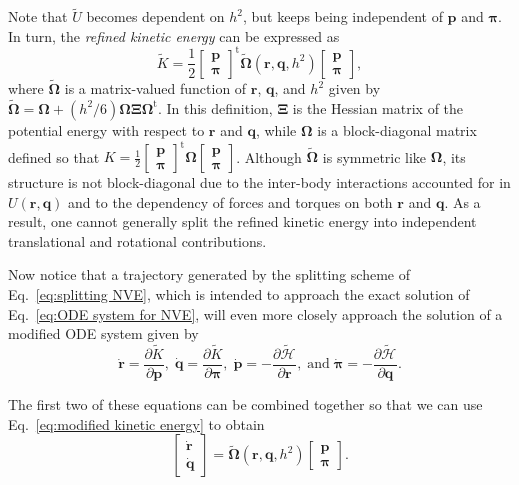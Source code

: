 \documentclass[
journal=jctcce,
layout=twocolumn
]{achemso}
\newcommand{\mt}[1]{\boldsymbol{\mathbf{#1}}}   %
\newcommand{\vt}[1]{\boldsymbol{\mathbf{#1}}}   %
\newcommand{\tr}[1]{#1^\text{t}}                %
\newcommand{\diff}[2]{\frac{\partial #1}{\partial #2}} %
\newcommand{\Ham}[1]{{\mathcal H}_\text{#1}}    %
\newcommand{\timestep}{h}
\newcommand{\refined}[1]{\widetilde{#1}}
\begin{document}
Note that $\refined U$ becomes dependent on $\timestep^2$, but keeps being independent of $\vt p$ and $\vt \pi$.
In turn, the \textit{refined kinetic energy} can be expressed as
\begin{equation}
\label{eq:modified kinetic energy}
\refined K = \frac{1}{2} \tr{\left[\begin{array}{c} \vt p \\ \vt \pi \end{array}\right]} \refined{\mathbf \Omega}(\vt r, \vt q, \timestep^2) \left[\begin{array}{c} \vt p \\ \vt \pi \end{array}\right],
\end{equation}
where $\refined{\mathbf \Omega}$ is a matrix-valued function of $\vt r$, $\vt q$, and $\timestep^2$ given by $\tilde{\mt \Omega} = {\mt \Omega} + ({\timestep^2}/{6}) {\mt \Omega} {\mt \Xi} \tr{\mt \Omega}$.
In this definition, $\mt \Xi$ is the Hessian matrix of the potential energy with respect to $\vt r$ and $\vt q$, while ${\mt \Omega}$ is a block-diagonal matrix defined so that $K = \frac{1}{2} \tr{[\substack{\vt p \\ \vt \pi}]} {\mt \Omega} [\substack{\vt p \\ \vt \pi}]$.
Although $\refined{\mathbf \Omega}$ is symmetric like $\mt \Omega$, its structure is not block-diagonal due to the inter-body interactions accounted for in $U(\vt r, \vt q)$ and to the dependency of forces and torques on both $\vt r$ and $\vt q$.
As a result, one cannot generally split the refined kinetic energy into independent translational and rotational contributions.

Now notice that a trajectory generated by the splitting scheme of Eq.~\eqref{eq:splitting NVE}, which is intended to approach the exact solution of Eq.~\eqref{eq:ODE system for NVE}, will even more closely approach the solution of a modified ODE system given by
\begin{equation*}
\dot{\vt r} = \diff{\refined K}{\vt p}, \;
\dot{\vt q} = \diff{\refined K}{\vt \pi}, \;
\dot{\vt p} = -\diff{\refined{\Ham{}}}{\vt r}, \; \text{and} \;
\dot{\vt \pi} = -\diff{\refined{\Ham{}}}{\vt q}.
\end{equation*}

The first two of these equations can be combined together so that we can use Eq.~\eqref{eq:modified kinetic energy} to obtain
\begin{equation}
\label{eq:shadow ODE system}
\left[\begin{array}{c} \dot{\vt r} \\ \dot{\vt q} \end{array}\right] = \refined{\mathbf \Omega}(\vt r, \vt q, \timestep^2) \left[\begin{array}{c} \vt p \\ \vt \pi \end{array}\right].
\end{equation}
\end{document}
